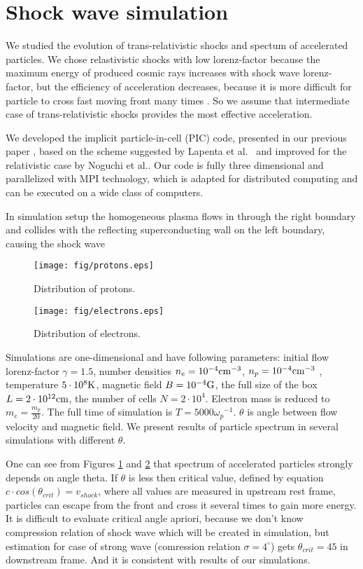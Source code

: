 \section{Shock wave simulation}
We studied the evolution of trans-relativistic shocks and spectum of accelerated particles. We chose relastivistic shocks with low lorenz-factor because the maximum energy of produced cosmic rays increases with shock wave lorenz-factor, but the efficiency of acceleration decreases, because it is more difficult for particle to cross fast moving front many times \cite{Ellison2013}. So we assume that intermediate case of trans-relativistic shocks provides the most effective acceleration.

We developed the implicit particle-in-cell (PIC) code, presented in our previous paper \cite{Romansky2016}, based on the scheme suggested by Lapenta et al.~\cite{Lapenta2006} and improved for the relativistic case by Noguchi et al.\cite{Noguchi2007}.
Our code is fully three dimensional and parallelized with MPI technology, which is adapted for distributed computing and can be executed on a wide class of computers.

In simulation setup the homogeneous plasma flows in through the right boundary
and collides with the reflecting superconducting wall on the left boundary, causing the shock wave
  

\begin{figure}[h!]
	\centering
	\texttt{[image: fig/protons.eps]} 
	\caption{Distribution of protons.}
	\label{protons}
\end{figure}
\begin{figure}[h!]
	\centering
	\texttt{[image: fig/electrons.eps]} 
	\caption{Distribution of electrons.}
	\label{electrons}
\end{figure}

Simulations are one-dimensional and have following parameters: initial flow lorenz-factor $\gamma = 1.5$, number densities $n_e = 10^{-4} \rm{cm}^{-3}$, $n_p = 10^{-4} \rm{cm}^{-3}$ , temperature $5\cdot10^8 \rm{K}$, magnetic field $B = 10^{-4} \rm{G}$, the full size of the box $L = 2\cdot10^{12} \rm{cm}$, the number of cells $N=2\cdot10^4$. Electron mass is reduced to $m_e = \frac{m_p}{20}$. The full time of simulation is $T = 5000 {\omega_p}^{-1}$. $\theta$ is angle between flow velocity and magnetic field. We present results of particle spectrum in several simulations with different $\theta$. 

One can see from Figures \ref{protons} and \ref{electrons} that spectrum of accelerated particles strongly depends on angle theta. If $\theta$ is less then critical value, defined by equation $c\cdot cos(\theta_{crit})=v_{shock}$, where all values are measured in upstream rest frame, particles can escape from the front and cross it several times to gain more energy. It is difficult to evaluate critical angle apriori, because we don't know compression relation of shock wave which will be created in simulation, but estimation for case of strong wave (comression relation $\sigma=4^{\circ}$) gets $\theta_{crit}=45$ in downstream frame. And it is consistent with results of our simulations.

